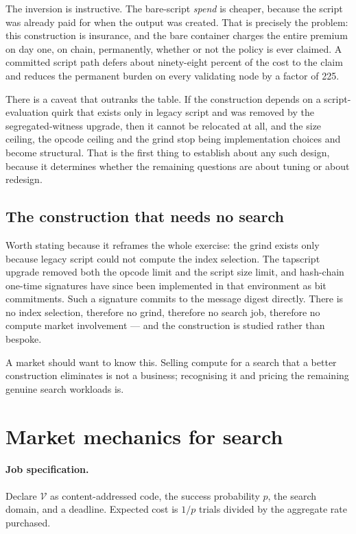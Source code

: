 \documentclass[11pt,a4paper]{article}
\begin{document}
The inversion is instructive. The bare-script \emph{spend} is cheaper, because
the script was already paid for when the output was created. That is precisely
the problem: this construction is insurance, and the bare container charges the
entire premium on day one, on chain, permanently, whether or not the policy is
ever claimed. A committed script path defers about ninety-eight percent of the
cost to the claim and reduces the permanent burden on every validating node by a
factor of \num{225}.

There is a caveat that outranks the table. If the construction depends on a
script-evaluation quirk that exists only in legacy script and was removed by the
segregated-witness upgrade, then it cannot be relocated at all, and the size
ceiling, the opcode ceiling and the grind stop being implementation choices and
become structural. That is the first thing to establish about any such design,
because it determines whether the remaining questions are about tuning or about
redesign.

\subsection{The construction that needs no search}

Worth stating because it reframes the whole exercise: the grind exists only
because legacy script could not compute the index selection. The tapscript
upgrade removed both the opcode limit and the script size limit, and hash-chain
one-time signatures have since been implemented in that environment as bit
commitments. Such a signature commits to the message digest directly. There is
no index selection, therefore no grind, therefore no search job, therefore no
compute market involvement --- and the construction is studied rather than
bespoke.

A market should want to know this. Selling compute for a search that a better
construction eliminates is not a business; recognising it and pricing the
remaining genuine search workloads is.

\section{Market mechanics for search}

\paragraph{Job specification.} Declare $\mathcal{V}$ as content-addressed code,
the success probability $p$, the search domain, and a deadline. Expected cost is
$1/p$ trials divided by the aggregate rate purchased.
\end{document}
